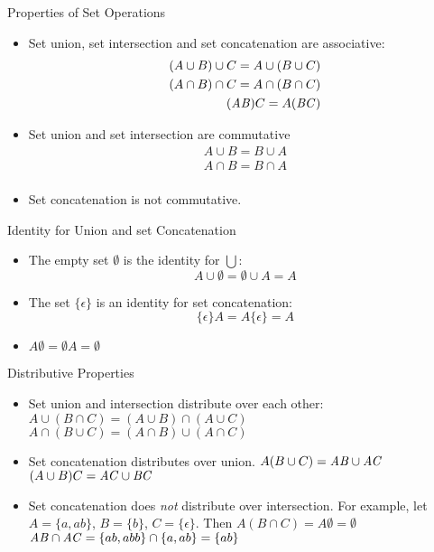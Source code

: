 \documentclass[style=sailor,size=12pt]{powerdot}
\begin{document}
\begin{slide}[bm=,toc=]{Properties of Set Operations}
\begin{itemize}
   \item Set union, set intersection and set concatenation are associative: 
   \[
     \begin{split}
     (A\cup B) \cup C = A \cup (B \cup C) \\
     (A\cap B) \cap C = A \cap (B \cap C) \\
     (\mathit{AB})C = A(\mathit{BC}) \\
     \end{split}
     \]
   \item Set union and set intersection are commutative
   \[
     \begin{split}
     A\cup B = B \cup A \\
     A\cap B = B \cap A \\
     \end{split}
    \]
    \item Set concatenation is not commutative.
\end{itemize}
\end{slide}

\begin{slide}[bm=,toc=]{Identity for Union and set Concatenation}
\begin{itemize}
   \item The empty set $\emptyset$ is the identity for $\bigcup$:
   \[
     A\cup \emptyset = \emptyset \cup A = A
     \]
   \item The set $\{\epsilon\}$ is an identity for set concatenation:
       \[
         \{\epsilon\}A = A\{\epsilon\} = A
       \]
   \item $A\emptyset = {\emptyset}A = \emptyset$
\end{itemize}
\end{slide}

\begin{slide}[bm=,toc=]{Distributive Properties}
\begin{itemize}
   \item  Set union and intersection distribute over each other:
   $A \cup (B \cap C) = (A\cup B)\cap(A \cup C)$\\
   $A \cap (B \cup C) = (A\cap B)\cup(A \cap C)$

   \item Set concatenation distributes over union. 
    $A(B\cup C) = \mathit{AB} \cup \mathit{AC}$\\
    $(A\cup B)C = \mathit{AC} \cup \mathit{BC}$
    \item Set concatenation does \emph{not} distribute over intersection. For
    example, let $A = \{a,ab\}$, $B = \{b\}$, $C = \{\epsilon\}$. Then
       $A(B\cap C) = A\emptyset = \emptyset$ \\
       $\mathit{AB} \cap \mathit{AC} = \{ab,abb\} \cap \{a,ab\} = \{ab\}$
\end{itemize}
\end{slide}
\end{document}
